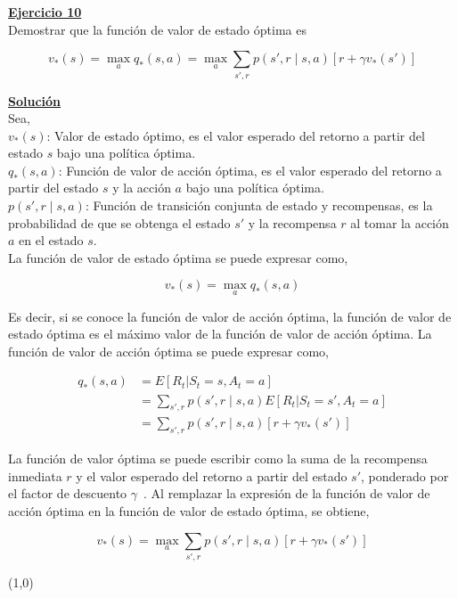 \indent\underline{\textbf{Ejercicio 10}}\\
Demostrar que la función de valor de estado óptima es

\[
    v_{\ast}(s) = \max_{a} q_{\ast}(s, a) = \max_{a} \sum_{s',r} p(s', r \mid s, a) [r + \gamma v_{\ast}(s')]
\]

\indent\underline{\textbf{Solución}}\\
Sea,\\
$v_{\ast} (s)$: Valor de estado óptimo, es el valor esperado del retorno a partir del estado $s$ bajo una política óptima.\\
$q_{\ast}(s, a)$: Función de valor de acción óptima, es el valor esperado del retorno a partir del estado $s$ y la acción $a$ bajo una política óptima.\\
$p(s', r \mid s, a)$: Función de transición conjunta de estado y recompensas, es la probabilidad de que se obtenga el estado $s'$ y la recompensa $r$ al tomar la acción $a$ en el estado $s$.\\

La función de valor de estado óptima se puede expresar como,

\[
    v_{\ast}(s) = \max_{a} q_{\ast}(s, a)
\]

Es decir, si se conoce la función de valor de acción óptima, la función de valor de estado óptima es el máximo valor de la función de valor de acción óptima.
La función de valor de acción óptima se puede expresar como,

\begin{align*}
    q_{\ast}(s, a) &= E[R_t | S_t = s, A_t = a]\\
    &= \sum_{s',r} p(s', r \mid s, a) E[R_t | S_t = s', A_t = a] \\
    &= \sum_{s',r} p(s', r \mid s, a) [r + \gamma v_{\ast}(s')]
\end{align*}

La función de valor óptima se puede escribir como la suma de la recompensa inmediata $r$ y el valor esperado del retorno a partir del estado $s'$, ponderado por el factor de descuento $\gamma$~\cite{Sutton2018}.
Al remplazar la expresión de la función de valor de acción óptima en la función de valor de estado óptima, se obtiene,

\[
    v_{\ast}(s) = \max_{a} \sum_{s',r} p(s', r \mid s, a) [r + \gamma v_{\ast}(s')]
\]

\line(1,0){\textwidth}
